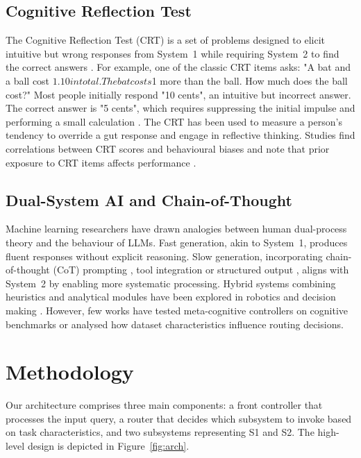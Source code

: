 \documentclass[11pt]{article}
\begin{document}
\subsection{Cognitive Reflection Test}
The Cognitive Reflection Test (CRT) is a set of problems designed to elicit
intuitive but wrong responses from System~1 while requiring System~2 to find
the correct answers \cite{frederick2005cognitive}.  For example, one of the
classic CRT items asks: "A bat and a ball cost $1.10 in total.  The bat
costs $1 more than the ball.  How much does the ball cost?"  Most people
initially respond "10 cents", an intuitive but incorrect answer.  The
correct answer is "5 cents", which requires suppressing the initial
impulse and performing a small calculation \cite{frederick2005cognitive}.  The CRT
has been used to measure a person's tendency to override a gut response
and engage in reflective thinking.  Studies find correlations between CRT
scores and behavioural biases \cite{hoppe2011behavioral} and note that prior
exposure to CRT items affects performance \cite{haigh2016standard}.

\subsection{Dual-System AI and Chain-of-Thought}
Machine learning researchers have drawn analogies between human dual-process
theory and the behaviour of LLMs.  Fast generation, akin to System~1,
produces fluent responses without explicit reasoning.  Slow generation,
incorporating chain-of-thought (CoT) prompting \cite{wei2022chain}, tool
integration or structured output
\cite{wang2022selfconsistency}, aligns with System~2 by enabling more
systematic processing.
Hybrid systems combining heuristics and
analytical modules have been explored in robotics and decision making
\cite{sloman1996empirical,evans2003two}.  However, few works have tested
meta-cognitive controllers on cognitive benchmarks or analysed how dataset
characteristics influence routing decisions.

\section{Methodology}
Our architecture comprises three main components: a front controller that
processes the input query, a router that decides which subsystem to invoke
based on task characteristics, and two subsystems representing S1 and S2.
The high-level design is depicted in Figure~\ref{fig:arch}.
\end{document}
